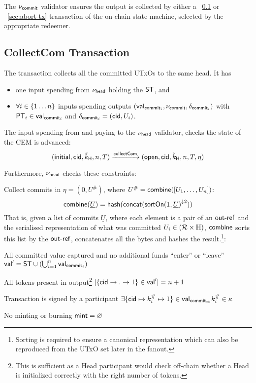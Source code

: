 \noindent The $\nu_{\mathsf{commit}}$ validator ensures the output is collected by either a \mtxCCom{}~\ref{sec:collect-tx} or \mtxAbort{}~\ref{sec:abort-tx} transaction of the on-chain state machine, selected by the appropriate redeemer.

\subsection{CollectCom Transaction}\label{sec:collect-tx}

\noindent The \mtxCCom{} transaction collects all the committed UTxOs to the same head. It has
\begin{itemize}
  \item one input spending from $\nu_\mathsf{head}$ holding the $\mathsf{ST}$, and
  \item $\forall i \in \{1 \dots n\}$ inputs spending \mtxCom{} outputs $(\mathsf{val}_{\mathsf{commit}_{i}}, \nu_{\mathsf{commit}}, \delta_{\mathsf{commit}_{i}})$ with $\mathsf{PT}_{i} \in \mathsf{val}_{\mathsf{commit}_{i}}$ and $\delta_{\mathsf{commit}_{i}} = (\mathsf{cid}, U_{i})$.
\end{itemize}
The input spending from and paying to the $\nu_\mathsf{head}$ validator, checks the state
of the CEM is advanced:
\[
   (\mathsf{initial},\mathsf{cid},\tilde{k}_{\mathsf{H}},n,T) \xrightarrow{\mathsf{collectCom}} (\mathsf{open},\mathsf{cid},\tilde{k}_{\mathsf{H}},n,T,\eta)
\]

\noindent Furthermore, $\nu_\mathsf{head}$ checks these constraints:
\begin{menumerate}
  \item Collect commits in $\eta = (0, U^{\#})$, where
  $U^{\#} = \mathsf{combine}([U_{1}, \dots, U_{n}])$:
  \[
    \mathsf{combine}(\underline{U}) = \mathsf{hash}(\mathsf{concat}({\mathsf{sortOn}(1, \underline{U})}^{\downarrow2}))
  \]
  That is, given a list of commits $\underline{U}$, where each element is a pair
  of an $\mathsf{out\textsf{-}{}ref}$ and the serialised representation of what was committed
  $U_{i} \in (\mathcal{R} \times \mathbb{H})$, $\mathsf{combine}$ sorts this list by the
  $\mathsf{out\textsf{-}{}ref}$, concatenates all the bytes and hashes the
  result.\footnote{Sorting is required to ensure a canonical representation
    which can also be reproduced from the UTxO set later in the fanout.}:

  \item All committed value captured and no additional funds ``enter'' or ``leave''\\
  $\mathsf{val}' = \mathsf{ST} \cup (\bigcup_{i=1}^{n} \mathsf{val}_{\mathsf{commit}_{i}})$
  \item All tokens present in output\footnote{This is sufficient as a Head participant would check off-chain whether a Head is initialized correctly with the right number of tokens.}
  $|\{\mathsf{cid} \rightarrow . \rightarrow 1\} \in \mathsf{val}'| = n + 1$
  \item Transaction is signed by a participant $\exists \{\mathsf{cid} \mapsto k^{\#}_{i} \mapsto 1\} \in \mathsf{val}_{\mathsf{commit}_{\Rightarrow}} k^{\#}_{i} \in \kappa$
  \item No minting or burning  $\mathsf{mint} = \varnothing$
\end{menumerate}

